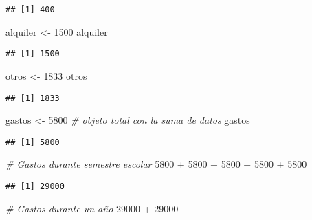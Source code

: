 \documentclass[
]{article}
\newenvironment{Shaded}{\begin{snugshade}}{\end{snugshade}}
\newcommand{\CommentTok}[1]{\textcolor[rgb]{0.56,0.35,0.01}{\textit{#1}}}
\newcommand{\DecValTok}[1]{\textcolor[rgb]{0.00,0.00,0.81}{#1}}
\newcommand{\NormalTok}[1]{#1}
\newcommand{\OtherTok}[1]{\textcolor[rgb]{0.56,0.35,0.01}{#1}}
\newcommand{\SpecialCharTok}[1]{\textcolor[rgb]{0.00,0.00,0.00}{#1}}
\begin{document}
\begin{verbatim}
## [1] 400
\end{verbatim}

\begin{Shaded}
\begin{Highlighting}[]
\NormalTok{alquiler }\OtherTok{\textless{}{-}} \DecValTok{1500}
\NormalTok{alquiler}
\end{Highlighting}
\end{Shaded}

\begin{verbatim}
## [1] 1500
\end{verbatim}

\begin{Shaded}
\begin{Highlighting}[]
\NormalTok{otros }\OtherTok{\textless{}{-}} \DecValTok{1833}
\NormalTok{otros}
\end{Highlighting}
\end{Shaded}

\begin{verbatim}
## [1] 1833
\end{verbatim}

\begin{Shaded}
\begin{Highlighting}[]
\NormalTok{gastos }\OtherTok{\textless{}{-}} \DecValTok{5800} \CommentTok{\# objeto total con la suma de datos}
\NormalTok{gastos}
\end{Highlighting}
\end{Shaded}

\begin{verbatim}
## [1] 5800
\end{verbatim}

\begin{Shaded}
\begin{Highlighting}[]
\CommentTok{\# Gastos durante semestre escolar}
\DecValTok{5800} \SpecialCharTok{+} \DecValTok{5800} \SpecialCharTok{+} \DecValTok{5800} \SpecialCharTok{+} \DecValTok{5800} \SpecialCharTok{+} \DecValTok{5800}
\end{Highlighting}
\end{Shaded}

\begin{verbatim}
## [1] 29000
\end{verbatim}

\begin{Shaded}
\begin{Highlighting}[]
\CommentTok{\# Gastos durante un año}
\DecValTok{29000} \SpecialCharTok{+} \DecValTok{29000}
\end{Highlighting}
\end{Shaded}
\end{document}
